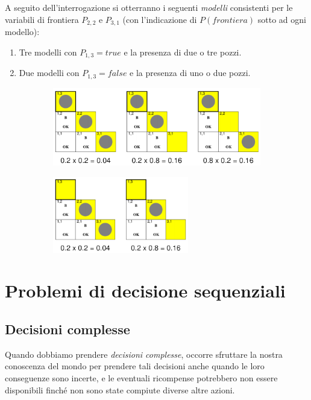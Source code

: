 \documentclass[11pt,oneside]{book}
\begin{document}
A seguito dell'interrogazione si otterranno i seguenti \textit{modelli} consistenti per le variabili di frontiera $P_{2,2}$ e $P_{3,1}$ (con l'indicazione di $P(frontiera)$ sotto ad ogni modello):
\begin{enumerate}[label=(\alph*)]
    \item Tre modelli con $P_{1,3} = true$ e la presenza di due o tre pozzi.
    \item Due modelli con $P_{1,3} = false$ e la presenza di uno o due pozzi.
\end{enumerate}
\begin{figure}[htp]
	\begin{subfigure}{0.49\textwidth}
	    \centering
		\includegraphics[width=\textwidth, height=\textheight, keepaspectratio]{modelli1.png}
		\caption{}
	\end{subfigure}
	\hfill
	\begin{subfigure}{0.49\textwidth}
	    \centering
		\includegraphics[width=0.65\textwidth]{modelli2.png}
		\caption{}
	\end{subfigure}
\end{figure}


\chapter{Problemi di decisione sequenziali}

\section{Decisioni complesse}
Quando dobbiamo prendere \textit{decisioni complesse}, occorre sfruttare la nostra conoscenza del mondo per prendere tali decisioni anche quando le loro conseguenze sono incerte, e le eventuali ricompense potrebbero non essere disponibili finché non sono state compiute diverse altre azioni.
\end{document}
